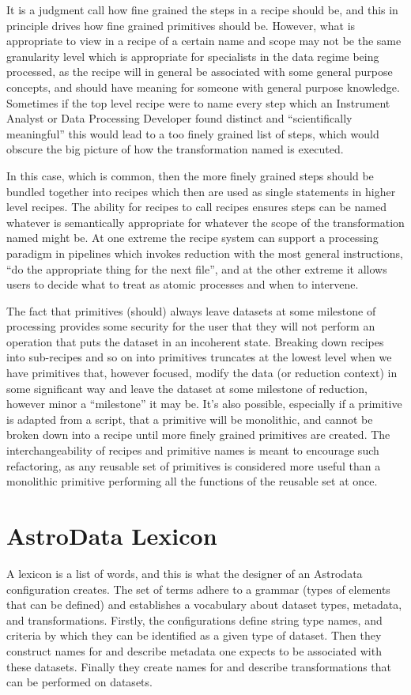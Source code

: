 \documentclass[letterpaper,10pt,english]{sphinxmanual}
\begin{document}
It is a judgment call how fine grained the steps in a recipe should
be, and this in principle drives how fine grained primitives should be.
However, what is appropriate to view in a recipe of a certain name and
scope may not be the same granularity level which is appropriate for
specialists in the data regime being processed, as the recipe will in
general be associated with some general purpose concepts, and should
have meaning for someone with general purpose knowledge. Sometimes if
the top level recipe were to name every step which an Instrument
Analyst or Data Processing Developer found distinct and
``scientifically meaningful'' this would lead to a too finely grained
list of steps, which would obscure the big picture of how the
transformation named is executed.

In this case, which is common, then the more finely grained steps
should be bundled together into recipes which then are used as single
statements in higher level recipes. The ability for recipes to call
recipes ensures steps can be named whatever is semantically
appropriate for whatever the scope of the transformation named might
be. At one extreme the recipe system can support a processing paradigm
in pipelines which invokes reduction with the most general
instructions, ``do the appropriate thing for the next file'', and at the
other extreme it allows users to decide what to treat as atomic
processes and when to intervene.

The fact that primitives (should) always leave datasets at some
milestone of processing provides some security for the user that they
will not perform an operation that puts the dataset in an incoherent
state. Breaking down recipes into sub-recipes and so on into
primitives truncates at the lowest level when we have primitives that,
however focused, modify the data (or reduction context) in some
significant way and leave the dataset at some milestone of reduction,
however minor a ``milestone'' it may be. It's also possible, especially
if a primitive is adapted from a script, that a primitive will be
monolithic, and cannot be broken down into a recipe until more finely
grained primitives are created. The interchangeability of recipes and
primitive names is meant to encourage such refactoring, as any
reusable set of primitives is considered more useful than a monolithic
primitive performing all the functions of the reusable set at once.


\section{AstroData Lexicon}
\label{gen.ADMANUAL_ADConcepts:astrodata-lexicon}
A lexicon is a list of words, and this is what the designer of an
Astrodata configuration creates. The set of terms adhere to a grammar
(types of elements that can be defined) and establishes a vocabulary
about dataset types, metadata, and transformations. Firstly, the
configurations define string type names, and criteria by which they
can be identified as a given type of dataset. Then they construct
names for and describe metadata one expects to be associated with
these datasets. Finally they create names for and describe
transformations that can be performed on datasets.
\end{document}
